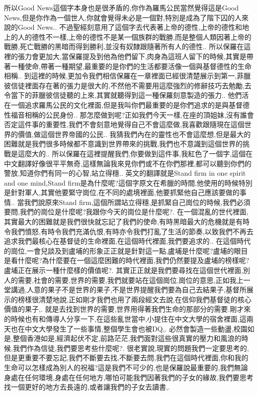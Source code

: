 \documentclass{book}
\begin{document}
所以Good News這個字本身也是很矛盾的,你作為羅馬公民當然覺得這是Good News,但是你作為一個世人,你就會覺得未必是一個對,特別是成為了階下囚的人來說的Good News..
不過聖經刻意用了這個字去代表著上帝的德性,上帝的德性和地上的人的德性不一樣,上帝的德性不是某一個族群的戰勝,而是整個人類因著上帝的戰勝,死亡戰勝的黑暗而得到勝利,並沒有奴隸跟隨著所有人的德性..
所以保羅在這裡的張力會更加大,當保羅提及到他為他們留下,肉身為這班人留下的時候,其實是帶著一種使命,帶著一種期望,最重要的是你們的生活都要活像一個與基督德性的生命相稱..
到這裡的時候,更加令我們相信保羅在一章裡面已經很清楚展示到第一,菲臘彼信徒裡面存在著的張力是很大的,不然他不需要用這麼強烈的修辭技巧去勉勵,去令當下的菲臘彼信徒聽的上來,其實就聽得到這一種保羅刻意製造的張力..
他們活在一個追求羅馬公民的文化裡面,但是我叫你們最重要的是你們追求的是與基督德性福音相稱的公民身份..
那怎麼做到呢?正如我們今天一樣,在座的頂姐妹,沒有誰會否定這件事的重要性,我們不會刻意地覺得自己不會這麼做,我喜歡跟隨現在這個世界的價值,做這個世界帝國的公民..
我猜我們內在的靈性也不會這麼想,但是最大的困難就是我們很多時候都不意識到世界帶來的挑戰,我們也不意識到這個世界的挑戰是這麼大的..
所以保羅在這裡提醒我們,你要做到這件事,我紅色了一個字,這個在中文翻譯好像很平平無奇,這樣無論我來見你們或不在你們那裡,都可以聽到你們的警放,知道你們有同一的心智,站立得穩..
英文的翻譯就是Stand firm in one spirit and one mind,Stand firm是為什麼呢?這個字原文在希臘的時間,他使用的時候特別是針對軍人,其實他要緊守崗位,在不同的處境裡面,他要抓緊他自己應該要做的事情..
當我們說原來Stand firm,這個所謂站立得穩,是抓緊自己崗位的時候,我們必須要問,我們的崗位是什麼呢?我跟你今天的崗位是什麼呢?.
在一個混亂的世代裡面,其實最大的困難就是我們很快就忘記了我們的使命,有時黑暗最大的危機就是有時令我們憤怒,有時令我們充滿仇恨,有時亦令我們打亂了生活的節奏,以致我們不再去追求我們最核心在基督徒的生命裡面,在這個時代裡面,我們要追求的..
在這個時代的崗位,一會兒談及到盧埔的形象正正就是針對這一點,盧埔是什麼呢?盧埔的眼目是看什麼呢?為什麼要在一個這麼困難的時代裡面,我們仍然要提及盧埔的榜樣呢?盧埔正在展示一種什麼樣的價值呢?.
其實正正就是我們要尋找在這個世代裡面,別人的需要,社會的需要,世界的需要,我們就要站在這個崗位,崗位的意思,正如我上一堂講過,人意的果子不是世界的果子,不是世界提醒我們要為自己去結果子,基督所展示的榜樣很清楚地說,正如剛才我們也用了兩段經文去說,在信仰我們基督徒的核心價值的果子,.
就是去找到世界的需要,世界用得著我們生命的那部分的需要.剛才來的時候也有和傳導人分享一下,在這些亂世當中,小提住在中文大學的宿舍裡面,這兩天也在中文大學發生了一些事情,整個學生會也被DQ,.
必然會製造一些動盪,校園如是,整個香港如是,經濟起伏不定,前路茫茫,我們面對這些很真實的壓力和風浪的時候,我們作為信徒,我們要思考些什麼呢?.
很老實說,現實的問題我們一定要思考的,但是更重要不要忘記,我們不斷要去找,不斷要去問,我們在這個時代裡面,你和我的生命可以怎樣成為別人的祝福?這是我們不可少的,也是保羅說最重要的,我們無論身處在任何環境,身處在任何地方,哪怕可能我們因著我們的子女的緣故,我們要思考找一個更好的地方去長遠的,或者讓我們的子女去讀書,.
\end{document}
